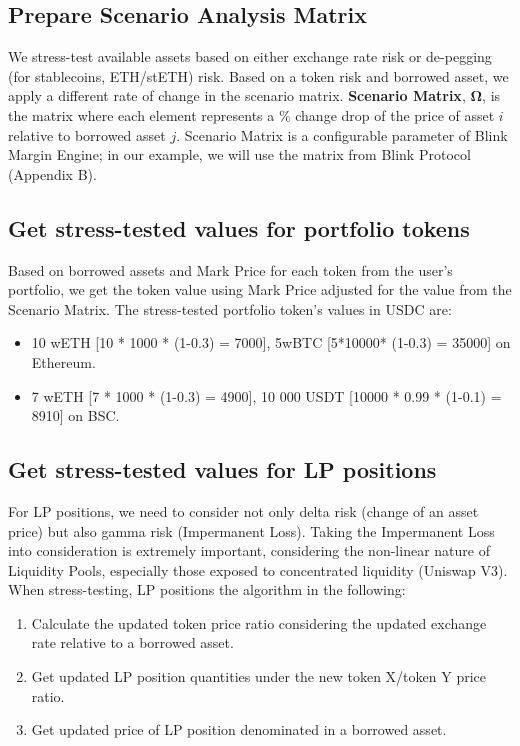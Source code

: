 \documentclass[conference]{IEEEtran}
\begin{document}
\subsection{Prepare Scenario Analysis Matrix}
We stress-test available assets based on either exchange rate risk or de-pegging (for stablecoins, ETH/stETH) risk. Based on a token risk and borrowed asset, we apply a different rate of change in the scenario matrix. \textbf{Scenario Matrix}, $\boldsymbol{\Omega}$, is the matrix where each element represents a $\%$ change drop of the price of asset $i$ relative to borrowed asset $j$. Scenario Matrix is a configurable parameter of Blink Margin Engine; in our example, we will use the matrix from Blink Protocol (Appendix B).



\subsection{Get stress-tested values for portfolio tokens}
Based on borrowed assets and Mark Price for each token from the user’s portfolio, we get the token value using Mark Price adjusted for the value from the Scenario Matrix. The stress-tested portfolio token’s values in USDC are:
\begin{itemize}
	\item 10 wETH [10 * 1000 * (1-0.3) = 7000], 5wBTC [5*10000* (1-0.3) = 35000] on Ethereum.
	\item 7 wETH [7 * 1000 * (1-0.3) = 4900], 10 000 USDT [10000 * 0.99 * (1-0.1) = 8910] on BSC.
\end{itemize}


\subsection{Get stress-tested values for LP positions}
For LP positions, we need to consider not only delta risk (change of an asset price) but also gamma risk (Impermanent Loss). Taking the Impermanent Loss into consideration is extremely important, considering the non-linear nature of Liquidity Pools, especially those exposed to concentrated liquidity (Uniswap V3). When stress-testing, LP positions the algorithm in the following: 
\begin{enumerate}
	\item Calculate the updated token price ratio considering the updated exchange rate relative to a borrowed asset. 
	\item Get updated LP position quantities under the new token X/token Y price ratio.
	\item Get updated price of LP position denominated in a borrowed asset.
\end{enumerate}
\end{document}
